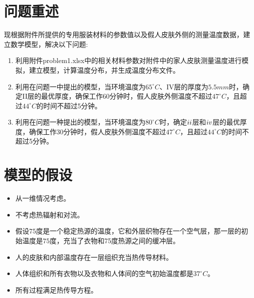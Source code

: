 \documentclass[bwprint]{cumcmthesis}
\begin{document}
\section{问题重述}
    \indent 现根据附件所提供的专用服装材料的参数值以及假人皮肤外侧的测量温度数据，建立数学模型，解决以下问题:
    \begin{enumerate}
        \item 利用附件problem1.xlsx中的相关材料参数对附件中的家人皮肤测量温度进行模拟，建立模型，计算温度分布，并生成温度分布文件。
        \item 利用在问题一中提出的模型，当环境温度为$65^{\circ}C$、IV层的厚度为$5.5mm$时，确定II层的最优厚度，确保工作60分钟时，假人皮肤外侧温度不超过$47^{\circ}C$，且超过$44^{\circ}C$的时间不超过5分钟。
        \item 利用在问题一种提出的模型，当环境温度为$80^{\circ}C$时，确定$\uppercase\expandafter{\romannumeral2}$层和$\uppercase\expandafter{\romannumeral4}$层的最优厚度，确保工作30分钟时，假人皮肤外侧温度不超过$47^{\circ}C$，且超过$44^{\circ}C$的时间不超过5分钟。
        
    \end{enumerate}

    \section{模型的假设}
    \begin{itemize}
    \item 从一维情况考虑。
    \item 不考虑热辐射和对流。
    \item 假设$75$度是一个稳定热源的温度，它和外层织物存在一个空气层，那一层的初始温度是$75$度，充当了衣物和75度热源之间的缓冲层。
    \item 人的皮肤和内部温度存在一层组织充当热传导材料。
    \item 人体组织和所有衣物以及衣物和人体间的空气初始温度都是$37^{\circ}C$。
    \item 所有过程满足热传导方程。
    \end{itemize}
\end{document}
